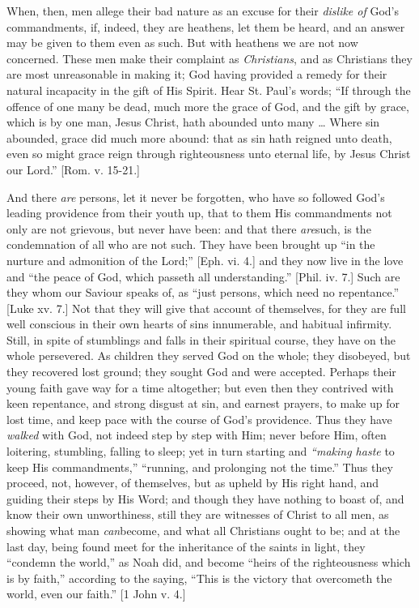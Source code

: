 When, then, men allege their bad nature as an excuse
for their \emph{dislike of} God's commandments, if,
indeed, they are heathens, let them be heard, and an
answer may be given to them even as such. But with
heathens we are not now concerned. These men make their
complaint as \emph{Christians}, and as Christians they
are most unreasonable in making it; God having provided a
remedy for their natural incapacity in the gift of His
Spirit. Hear St. Paul's words; ``If through the
offence of one many be dead, much more the grace of God,
and the gift by grace, which is by one man, Jesus Christ,
hath abounded unto many … Where sin abounded, grace
did much more abound: that as sin hath reigned unto
death, even so might grace reign through righteousness
unto eternal life, by Jesus Christ our Lord.'' [Rom.
v. 15-21.]

And there \emph{are} persons, let it never be
forgotten, who have so followed God's leading providence
from their youth up, that to them His commandments not
only are not grievous, but never have been: and that
there \emph{are}such, is the condemnation of all who are
not such. They have been brought up ``in the nurture
and admonition of the Lord;'' [Eph. vi. 4.] and they
now live in the love and ``the peace of God, which
passeth all understanding.'' [Phil. iv. 7.] Such are
they whom our Saviour speaks of, as ``just persons,
which need no repentance.'' [Luke xv. 7.] Not that
they will give that account of themselves, for they are
full well conscious in their own hearts of sins
innumerable, and habitual infirmity. Still, in spite of
stumblings and falls in their spiritual course, they have
on the whole persevered. As children they served God on
the whole; they disobeyed, but they recovered lost
ground; they sought God and were accepted. Perhaps their
young faith gave way for a time altogether; but even then
they contrived with keen repentance, and strong disgust
at sin, and earnest prayers, to make up for lost time,
and keep pace with the course of God's providence. Thus
they have \emph{walked} with God, not indeed step by step
with Him; never before Him, often loitering, stumbling,
falling to sleep; yet in turn starting and \emph{``making
haste} to keep His commandments,'' ``running,
and prolonging not the time.'' Thus they proceed,
not, however, of themselves, but as upheld by His right
hand, and guiding their steps by His Word; and though
they have nothing to boast of, and know their own
unworthiness, still they are witnesses of Christ to all
men, as showing what man \emph{can}become, and what all
Christians ought to be; and at the last day, being found
meet for the inheritance of the saints in light, they
``condemn the world,'' as Noah did, and become
``heirs of the righteousness which is by faith,''
according to the saying, ``This is the victory that
overcometh the world, even our faith.'' [1 John v.
4.]

